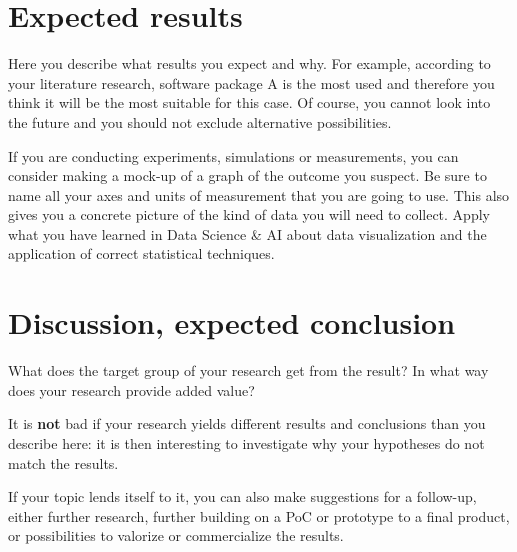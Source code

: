 \documentclass[english]{hogent-article}
\begin{document}
\section{Expected results}%
\label{sec:expected-results}


Here you describe what results you expect and why. For example, according to your literature research, software package A is the most used and therefore you think it will be the most suitable for this case. Of course, you cannot look into the future and you should not exclude alternative possibilities.

If you are conducting experiments, simulations or measurements, you can consider making a mock-up of a graph of the outcome you suspect. Be sure to name all your axes and units of measurement that you are going to use. This also gives you a concrete picture of the kind of data you will need to collect. Apply what you have learned in Data Science \& AI about data visualization and the application of correct statistical techniques.

\section{Discussion, expected conclusion}%
\label{sec:discussion-conclusion}

What does the target group of your research get from the result? In what way does your research provide added value?

It is \textbf{not} bad if your research yields different results and conclusions than you describe here: it is then interesting to investigate why your hypotheses do not match the results.

If your topic lends itself to it, you can also make suggestions for a follow-up, either further research, further building on a PoC or prototype to a final product, or possibilities to valorize or commercialize the results.


\printbibliography[heading=bibintoc]
\end{document}
